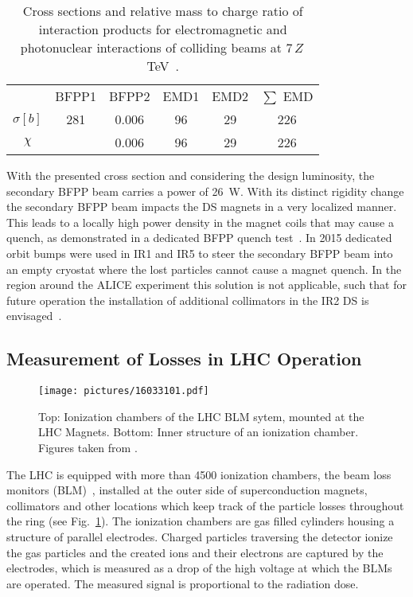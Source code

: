 \begin{table}[h]
\centering
\caption{Cross sections and relative mass to charge ratio of interaction products for electromagnetic and photonuclear interactions of colliding \lead beams at 7$\,Z\,$TeV~\cite{schaum:thesis}.}
\label{tab:BFPP_cross_section}
\begin{tabular}{cccccc}
\toprule
 & BFPP1 & BFPP2 & EMD1 & EMD2 & $\sum$ EMD  \\
$\sigma [b]$ & 281 & 0.006 & 96  & 29 & 226 \\ 
$\chi  $  &  & 0.006 & 96  & 29 & 226 \\ \bottomrule
\end{tabular}
\end{table}

%
With the presented cross section and considering the design luminosity, the secondary BFPP beam carries a power of 26~W. With its distinct rigidity change the secondary BFPP beam impacts the DS magnets in a very localized manner. This leads to a locally high power density in the magnet coils that may cause a quench, as demonstrated in a dedicated BFPP quench test~\cite{}. In 2015 dedicated orbit bumps were used in IR1 and IR5 to steer the secondary BFPP beam into an empty cryostat where the lost particles cannot cause a magnet quench. In the region around the ALICE experiment this solution is not applicable, such that for future operation the installation of additional collimators in the IR2 DS is envisaged~\cite{}. 


%



\subsection{Measurement of Losses in LHC Operation}
%
\begin{figure}[b]  
    \centering
    \texttt{[image: pictures/16033101.pdf]}
    \caption{Top: Ionization chambers of the LHC BLM sytem, mounted at the LHC Magnets. Bottom: Inner structure of an ionization chamber. Figures taken from \cite{BLM_homepage}.}  
    \label{pic:16033101}
\end{figure}

The LHC is equipped with more than 4500 ionization chambers, the beam loss monitors (BLM)~\cite{BLMref1,BLMref02}, installed at the outer side of superconduction magnets, collimators and other locations which keep track of the particle losses throughout the ring (see Fig.~\ref{pic:16033101}). The ionization chambers are gas filled cylinders housing a structure of parallel electrodes. Charged particles traversing the detector ionize the gas particles and the created ions and their electrons are captured by the electrodes, which is measured as a drop of the high voltage at which the BLMs are operated. The measured signal is proportional to the radiation dose.
%
%
%


